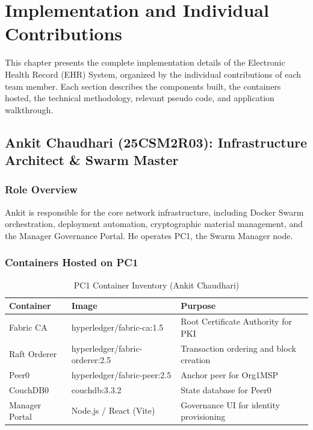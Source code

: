 \chapter{Implementation and Individual Contributions}

This chapter presents the complete implementation details of the Electronic Health Record (EHR) System, organized by the individual contributions of each team member. Each section describes the components built, the containers hosted, the technical methodology, relevant pseudo code, and application walkthrough.


\section{Ankit Chaudhari (25CSM2R03): Infrastructure Architect \& Swarm Master}

\subsection{Role Overview}
Ankit is responsible for the core network infrastructure, including Docker Swarm orchestration, deployment automation, cryptographic material management, and the Manager Governance Portal. He operates PC1, the Swarm Manager node.

\subsection{Containers Hosted on PC1}

\begin{table}[h]
\centering
\caption{PC1 Container Inventory (Ankit Chaudhari)}
\label{tab:ankit_containers}
\begin{tabular}{|l|l|p{6cm}|}
\hline
\textbf{Container} & \textbf{Image} & \textbf{Purpose} \\
\hline
Fabric CA & hyperledger/fabric-ca:1.5 & Root Certificate Authority for PKI \\
\hline
Raft Orderer & hyperledger/fabric-orderer:2.5 & Transaction ordering and block creation \\
\hline
Peer0 & hyperledger/fabric-peer:2.5 & Anchor peer for Org1MSP \\
\hline
CouchDB0 & couchdb:3.3.2 & State database for Peer0 \\
\hline
Manager Portal & Node.js / React (Vite) & Governance UI for identity provisioning \\
\hline
\end{tabular}
\end{table}

